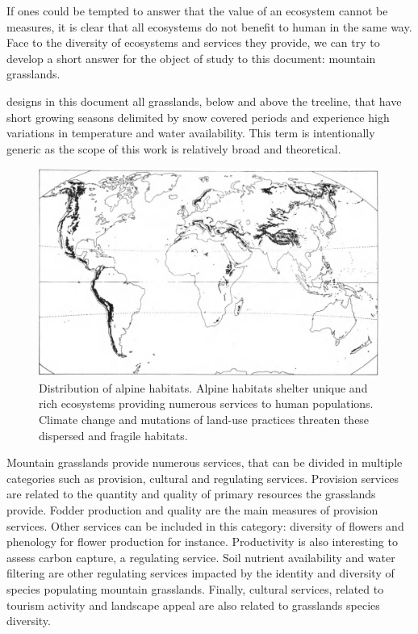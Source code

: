 If ones could be tempted to answer that the value of an ecosystem cannot be measures, it is clear that all ecosystems do not benefit to human in the same way. Face to the diversity of ecosystems and services they provide, we can try to develop a short answer for the object of study to this document: mountain grasslands.

 designs in this document all grasslands, below and above the treeline, that have short growing seasons delimited by snow covered periods and experience high variations in temperature and water availability. This term is intentionally generic as the scope of this work is relatively broad and theoretical.

\begin{figure}
\includegraphics{./1_Introduction/graphics/alpine_distribution.jpeg}
\caption{Distribution of alpine habitats. Alpine habitats shelter unique and rich ecosystems providing numerous services to human populations. Climate change and mutations of land-use practices threaten these dispersed and fragile habitats.}
\end{figure}

Mountain grasslands provide numerous services, that can be divided in multiple categories such as provision, cultural and regulating services. Provision services are related to the quantity and quality of primary resources the grasslands provide. Fodder production and quality are the main measures of provision services. Other services can be included in this category: diversity of flowers and phenology for flower production for instance. Productivity is also interesting to assess carbon capture, a regulating service. Soil nutrient availability and water filtering are other regulating services impacted by the identity and diversity of species populating mountain grasslands. Finally, cultural services, related to tourism activity and landscape appeal are also related to grasslands species diversity.


